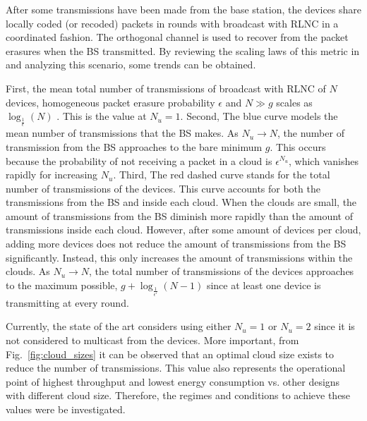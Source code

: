 After some transmissions have been made from the base station, the devices share locally coded (or recoded) packets in rounds with broadcast with \ac{RLNC} in a coordinated fashion. The orthogonal channel is used to recover from the packet erasures when the \ac{BS} transmitted. By reviewing the scaling laws of this metric in \cite{eryilmaz2008delay} and analyzing this scenario, some trends can be obtained.

First, the mean total number of transmissions of broadcast with \ac{RLNC} of $N$ devices, homogeneous packet erasure probability $\epsilon$ and $N \gg g$ scales as $\log_{\frac{1}{\epsilon}}(N)$ \cite{eryilmaz2008delay}. This is the value at $N_u = 1$. Second, The blue curve models the mean number of transmissions that the \ac{BS} makes. As $N_u \rightarrow N$, the number of transmission from the \ac{BS} approaches to the bare minimum $g$. This occurs because the probability of not receiving a packet in a cloud is ${\epsilon}^{N_u}$, which vanishes rapidly for increasing $N_u$. Third, The red dashed curve stands for the total number of transmissions of the devices. This curve accounts for both the transmissions from the \ac{BS} and inside each cloud. When the clouds are small, the amount of transmissions from the \ac{BS} diminish more rapidly than the amount of transmissions inside each cloud. However, after some amount of devices per cloud, adding more devices does not reduce the amount of transmissions from the \ac{BS} significantly. Instead, this only increases the amount of transmissions within the clouds. As $N_u \rightarrow N$, the total number of transmissions of the devices approaches to the maximum possible, $ g + \log_{\frac{1}{\epsilon'}}(N - 1)$ since at least one device is transmitting at every round.

Currently, the state of the art considers using either $N_u = 1$ or $N_u = 2$ since it is not considered to multicast from the devices. More important, from Fig.~\ref{fig:cloud_sizes} it can be observed that an optimal cloud size exists to reduce the number of transmissions. This value also represents the operational point of highest throughput and lowest energy consumption vs. other designs with different cloud size. Therefore, the regimes and conditions to achieve these values were be investigated.

